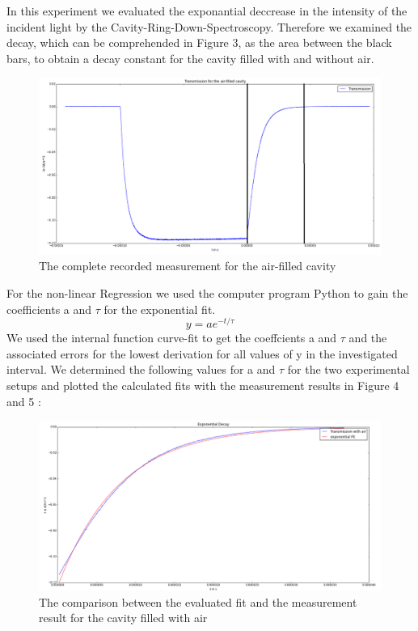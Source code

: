 \documentclass[10pt,a4paper]{article}
\begin{document}
In this experiment we evaluated the exponantial deccrease in the intensity of the incident light by the Cavity-Ring-Down-Spectroscopy. Therefore we examined the decay, which can be comprehended in Figure 3, as the area between the black bars, to obtain a decay constant for the cavity filled with and without air.
\begin{figure}[h]
	\includegraphics[scale = 0.7]{graphair.png}
	\centering
	\caption{The complete recorded measurement for the air-filled cavity}
	\label{Complete Measurement for air}
\end{figure}
For the non-linear Regression we used the computer program Python to gain the coefficients a and $\tau$ for the exponential fit.
\begin{equation}
	y = a e^{-t/\tau}
\end{equation}
We used the internal function curve-fit to get the coeffcients a and $\tau$ and the associated errors for the lowest derivation for all values of y in the investigated interval. We determined the following values for a and $\tau$ for the two experimental setups and plotted the calculated fits with the measurement results in Figure 4 and 5 :
\\
\begin{figure}[h]
	\includegraphics[scale = 0.7]{expair.png}
	\centering
	\caption{The comparison between the evaluated fit and the measurement result for the cavity filled with air}
	\label{exponential air}
\end{figure}
\end{document}
